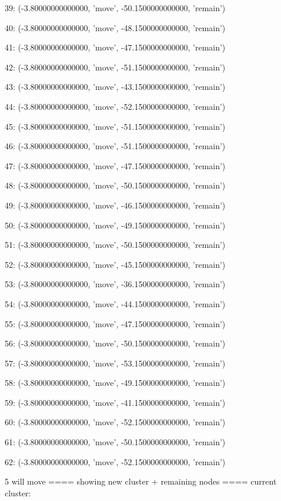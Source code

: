 39: (-3.80000000000000, 'move', -50.1500000000000, 'remain')


40: (-3.80000000000000, 'move', -48.1500000000000, 'remain')


41: (-3.80000000000000, 'move', -47.1500000000000, 'remain')


42: (-3.80000000000000, 'move', -51.1500000000000, 'remain')


43: (-3.80000000000000, 'move', -43.1500000000000, 'remain')


44: (-3.80000000000000, 'move', -52.1500000000000, 'remain')


45: (-3.80000000000000, 'move', -51.1500000000000, 'remain')


46: (-3.80000000000000, 'move', -51.1500000000000, 'remain')


47: (-3.80000000000000, 'move', -47.1500000000000, 'remain')


48: (-3.80000000000000, 'move', -50.1500000000000, 'remain')


49: (-3.80000000000000, 'move', -46.1500000000000, 'remain')


50: (-3.80000000000000, 'move', -49.1500000000000, 'remain')


51: (-3.80000000000000, 'move', -50.1500000000000, 'remain')


52: (-3.80000000000000, 'move', -45.1500000000000, 'remain')


53: (-3.80000000000000, 'move', -36.1500000000000, 'remain')


54: (-3.80000000000000, 'move', -44.1500000000000, 'remain')


55: (-3.80000000000000, 'move', -47.1500000000000, 'remain')


56: (-3.80000000000000, 'move', -50.1500000000000, 'remain')


57: (-3.80000000000000, 'move', -53.1500000000000, 'remain')


58: (-3.80000000000000, 'move', -49.1500000000000, 'remain')


59: (-3.80000000000000, 'move', -41.1500000000000, 'remain')


60: (-3.80000000000000, 'move', -52.1500000000000, 'remain')


61: (-3.80000000000000, 'move', -50.1500000000000, 'remain')


62: (-3.80000000000000, 'move', -52.1500000000000, 'remain')


5 will move
==== showing new cluster + remaining nodes ====
current cluster:


